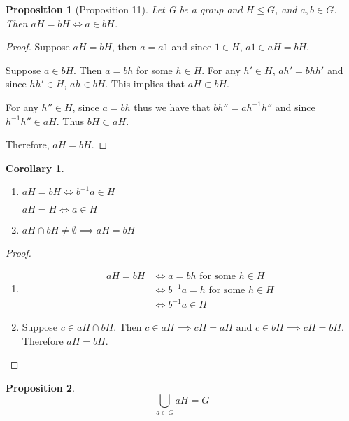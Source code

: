 \documentclass[11pt, oneside]{book}
\theoremstyle{break}
\newtheorem*{proof}{Proof}
\newtheorem{crly}{Corollary}[section]
\newtheorem{propo}{Proposition}[section]
\begin{document}
\begin{propo}[Proposition 11]\label{propo:11}
    Let G be a group and $H \leq G$, and $a, b \in G$. Then $aH = bH \iff a \in bH$.
\end{propo}

\begin{proof}
    Suppose $aH = bH$, then $a = a 1$ and since $1 \in H$, $a 1 \in aH = bH$.

    Suppose $a \in bH$. Then $a = bh$ for some $h \in H$. For any $h' \in H$, $ah' = bhh'$ and since $hh' \in H$, $ah \in bH$. This implies that $aH \subset bH$.

    For any $h'' \in H$, since $a = bh$ thus we have that $bh'' = ah^{-1}h''$ and since $h^{-1}h'' \in aH$. Thus $bH \subset aH$.

    Therefore, $aH = bH$.
\end{proof}

\begin{crly}
    \begin{enumerate}
        \item $aH = bH \iff b^{-1}a \in H$

            $aH = H \iff a \in H$

        \item $aH \cap bH \neq \emptyset \implies aH = bH$
    \end{enumerate}
\end{crly}

\begin{proof}
    \begin{enumerate}
        \item \begin{align*}
            aH = bH &\iff a = bh \text{ for some } h \in H \\
                &\iff b^{-1}a = h \text{ for some } h \in H \\
                &\iff b^{-1}a \in H
        \end{align*}

        \item Suppose $c \in aH \cap bH$. Then $c \in aH \implies cH = aH$ and $c \in bH \implies cH = bH$. Therefore $aH = bH$.
    \end{enumerate}
\end{proof}

\begin{propo}
    \begin{equation}
        \bigcup_{a \in G} aH = G
    \end{equation}
\end{propo}
\end{document}
